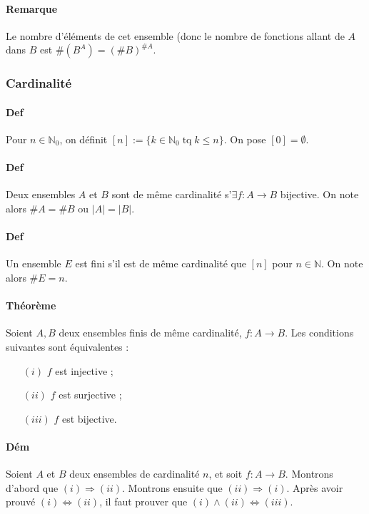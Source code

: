 \documentclass{article}
\DeclareMathOperator{\tq}{\text{ tq }}
\begin{document}
			\paragraph{Remarque} Le nombre d'éléments de cet ensemble (donc le nombre de fonctions allant de $A$ dans $B$ est $\#(B^A) = (\#B)^{\#A}$.

			\subsubsection{Cardinalité}

			\paragraph{Def} Pour $n \in \mathbb N_0$, on définit $[n] := \{k \in \mathbb N_0 \tq k \leq n\}$. On pose $[0] = \emptyset$.

			\paragraph{Def} Deux ensembles $A$ et $B$ sont de même cardinalité s'$\exists f : A \to B$ bijective. On note alors $\#A = \#B$ ou $|A| = |B|$.

			\paragraph{Def} Un ensemble $E$ est fini s'il est de même cardinalité que $[n]$ pour $n \in \mathbb N$. On note alors $\#E = n$.

			\paragraph{Théorème} Soient $A, B$ deux ensembles finis de même cardinalité, $f : A \to B$. Les conditions suivantes sont équivalentes :

			\begin{itemize}
				\item[$(i)$]   $f$ est injective ;
				\item[$(ii)$]  $f$ est surjective ;
				\item[$(iii)$] $f$ est bijective.
			\end{itemize}

			\paragraph{Dém} Soient $A$ et $B$ deux ensembles de cardinalité $n$, et soit $f : A \to B$. Montrons d'abord que $(i) \Rightarrow (ii)$. Montrons ensuite que
			$(ii) \Rightarrow (i)$. Après avoir prouvé $(i) \iff (ii)$, il faut prouver que $(i) \land (ii) \iff (iii)$.
\end{document}
